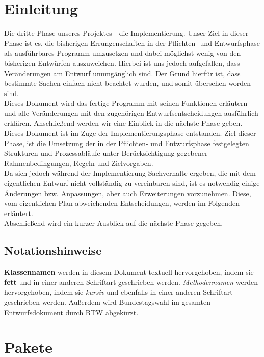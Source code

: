 \documentclass[12pt,a4paper,titlepage]{article}
\newcommand{\myma}{\fontfamily{pcr}\selectfont \textbf}
\newcommand{\mymo}{\fontfamily{pcr}\selectfont \textit}
\begin{document}
\section{Einleitung}
Die dritte Phase unseres Projektes - die Implementierung. Unser Ziel in dieser Phase ist es, die bisherigen Errungenschaften in der Pflichten- und Entwurfsphase als ausführbares Programm umzusetzen und dabei möglichst wenig von den bisherigen Entwürfen auszuweichen. Hierbei ist uns jedoch aufgefallen, dass Veränderungen am Entwurf unumgänglich sind. Der Grund hierfür ist, dass bestimmte Sachen einfach nicht beachtet wurden, und somit übersehen worden sind. \\
Dieses Dokument wird das fertige Programm mit seinen Funktionen erläutern und alle Veränderungen mit den zugehörigen Entwurfsentscheidungen ausführlich erklären. Anschließend werden wir eine Einblick in die nächste Phase geben. \\

Dieses Dokument ist im Zuge der Implementierungsphase entstanden. Ziel dieser Phase, ist die Umsetzung der in der Pflichten- und Entwurfsphase festgelegten Strukturen und Prozessabläufe unter Berücksichtigung gegebener Rahmenbedingungen, Regeln und Zielvorgaben. \\
Da sich jedoch während der Implementierung Sachverhalte ergeben, die mit dem eigentlichen Entwurf nicht vollständig zu vereinbaren sind, ist es notwendig einige Änderungen bzw. Anpassungen, aber auch Erweiterungen vorzunehmen. Diese, vom eigentlichen Plan abweichenden Entscheidungen, werden im Folgenden erläutert. \\
Abschließend wird ein kurzer Ausblick auf die nächste Phase gegeben. \\


\subsection{Notationshinweise}
{\myma{Klassennamen}} werden in diesem Dokument textuell hervorgehoben, indem sie \textbf{fett} und in einer anderen Schriftart geschrieben werden.\newline
{\mymo{Methodennamen}} werden hervorgehoben, indem sie  \textit{kursiv} und ebenfalls in einer anderen Schriftart geschrieben werden.\newline
Außerdem wird Bundestagswahl im gesamten Entwurfsdokument durch BTW abgekürzt.
\newpage

\section{Pakete}
\end{document}
